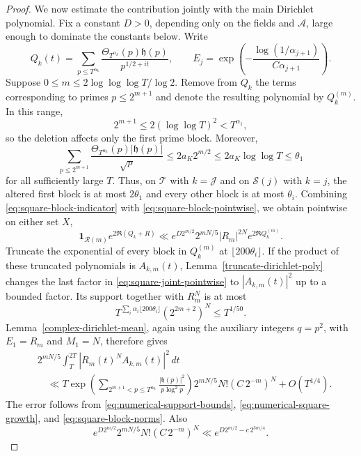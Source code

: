 \documentclass[twoside,reqno,11pt,a4paper]{amsart}
\numberwithin{equation}{section}
\theoremstyle{plain}
\theoremstyle{definition}
\theoremstyle{remark}
\renewcommand{\le}{\leqslant}
\begin{document}
\begin{proof}
We now estimate the contribution jointly with the main Dirichlet polynomial.
Fix a constant $D>0$, depending only on the fields and $\mathcal A$, large
enough to dominate the constants below.  Write
\begin{equation*}
 Q_k(t)=\sum_{p\le T^{\alpha_k}}
 \frac{\Theta_{T^{\alpha_k}}(p)\mathfrak h(p)}{p^{1/2+it}},
 \qquad E_j=\exp\left(-\frac{\log(1/\alpha_{j+1})}{C\alpha_{j+1}}\right).
\end{equation*}
Suppose $0\le m\le2\log\log\log T/\log2$.  Remove from $Q_k$ the terms corresponding to primes $p\le2^{m+1}$ and denote the resulting polynomial by $Q_k^{(m)}$.
In this range,
\begin{equation*}
2^{m+1}\le2(\log\log T)^2<T^{\alpha_1},
\end{equation*}
so the deletion affects only the first prime block.  Moreover,
\begin{equation*}
\sum_{p\le2^{m+1}}
\frac{\Theta_{T^{\alpha_k}}(p)|\mathfrak h(p)|}{\sqrt p}
\le2a_K2^{m/2}\le2a_K\log\log T\le\theta_1
\end{equation*}
for all sufficiently large $T$.  Thus, on $\mathcal T$ with
$k=\mathcal J$ and on $\mathcal S(j)$ with $k=j$, the altered first
block is at most $2\theta_1$ and every other block is at most $\theta_i$.
Combining
\eqref{eq:square-block-indicator} with \eqref{eq:square-block-pointwise}, we
obtain pointwise on either set $X$,
\begin{equation}\label{eq:square-joint-pointwise}
 \mathbf1_{\mathcal R(m)}e^{2\Re(Q_k+R)}
 \ll e^{D2^{m/2}}2^{mN/5}|R_m|^{2N}e^{2\Re Q_k^{(m)}}.
\end{equation}
Truncate the exponential of every block in $Q_k^{(m)}$ at
$\lfloor200\theta_i\rfloor$.  If the product of these truncated polynomials
is $A_{k,m}(t)$, Lemma~\ref{truncate-dirichlet-poly} changes the last factor
in \eqref{eq:square-joint-pointwise} to $|A_{k,m}(t)|^2$ up to a bounded
factor.  Its support together with $R_m^N$ is at most
\begin{equation*}
 T^{\sum_i\alpha_i\lfloor200\theta_i\rfloor}(2^{2m+2})^N\le T^{1/50}.
\end{equation*}
Lemma~\ref{complex-dirichlet-mean}, again using the auxiliary integers
$q=p^2$, with $E_1=R_m$ and $M_1=N$, therefore gives
\begin{align}\label{eq:square-joint-diagonal}
 &2^{mN/5}\int_T^{2T}|R_m(t)^NA_{k,m}(t)|^2\,dt\nonumber\\
 &\quad\ll T\exp\left(\sum_{2^{m+1}<p\le T^{\alpha_k}}
 \frac{|\mathfrak h(p)|^2}{p\log^2p}\right)
 2^{mN/5}N!(C\,2^{-m})^N+O(T^{1/4}).
\end{align}
The error follows from \eqref{eq:numerical-support-bounds},
\eqref{eq:numerical-square-growth}, and \eqref{eq:square-block-norms}.  Also
\begin{equation}\label{eq:square-block-saving}
 e^{D2^{m/2}}2^{mN/5}N!(C\,2^{-m})^N
 \ll e^{D2^{m/2}-c\,2^{3m/4}}.
\end{equation}


\end{proof}
\end{document}
